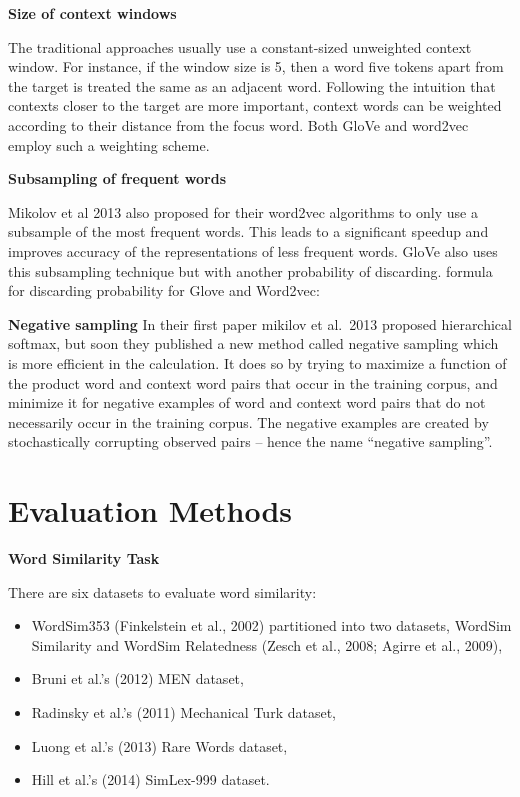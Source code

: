 \documentclass[]{krantz}
\providecommand{\tightlist}{%
  \setlength{\itemsep}{0pt}\setlength{\parskip}{0pt}}
\begin{document}
\textbf{Size of context windows}

The traditional approaches usually use a constant-sized unweighted context window. For instance, if the window size is 5, then a word five tokens apart from the target is treated the same as an adjacent word. Following the intuition that contexts closer to the target are more important, context words can be weighted according to their distance from the focus word. Both GloVe and word2vec employ such a weighting scheme.

\textbf{Subsampling of frequent words}

Mikolov et al 2013 also proposed for their word2vec algorithms to only use a subsample of the most frequent words. This leads to a significant speedup and improves accuracy of the representations of less frequent words. GloVe also uses this subsampling technique but with another probability of discarding.
formula for discarding probability for Glove and Word2vec:

\textbf{Negative sampling}
In their first paper mikilov et al.~2013 proposed hierarchical softmax, but soon they published a new method called negative sampling which is more efficient in the calculation. It does so by trying to maximize a function of the product word and context word pairs that occur in the training corpus, and minimize it for negative examples of word and context word pairs that do not necessarily occur in the training corpus. The negative examples are created by stochastically corrupting observed pairs -- hence the name ``negative sampling''.

\hypertarget{evaluation-methods}{%
\section{Evaluation Methods}\label{evaluation-methods}}

\textbf{Word Similarity Task}

There are six datasets to evaluate word similarity:

\begin{itemize}
\tightlist
\item
  WordSim353 (Finkelstein et al., 2002) partitioned into two datasets, WordSim Similarity and WordSim Relatedness (Zesch et al., 2008; Agirre et al., 2009),
\item
  Bruni et al.'s (2012) MEN dataset,
\item
  Radinsky et al.'s (2011) Mechanical Turk dataset,
\item
  Luong et al.'s (2013) Rare Words dataset,
\item
  Hill et al.'s (2014) SimLex-999 dataset.
\end{itemize}
\end{document}
